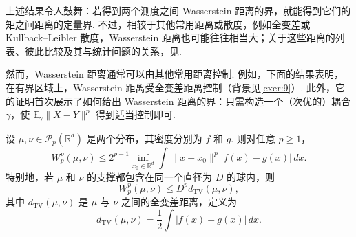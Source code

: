 上述结果令人鼓舞：若得到两个测度之间 Wasserstein 距离的界，就能得到它们的矩之间距离的定量界. 不过，相较于其他常用距离或散度，例如全变差或 Kullback--Leibler 散度，Wasserstein 距离也可能往往相当大；关于这些距离的列表、彼此比较及其与统计问题的关系，见\cite[第 2 章]{ref302}.

然而，Wasserstein 距离通常可以由其他常用距离控制. 例如，下面的结果表明，在有界区域上，Wasserstein 距离受全变差距离控制（背景见\autoref{exer:9}）. 此外，它的证明首次展示了如何给出 Wasserstein 距离的界：只需构造一个（次优的）耦合 $\gamma$，使 $\mathbb E_\gamma\lVert X-Y\rVert^p$ 得到适当控制即可.

\begin{theorem}\label{thm:1.6}
设 $\mu,\nu\in\mathcal P_p(\mathbb R^d)$ 是两个分布，其密度分别为 $f$ 和 $g$. 则对任意 $p\ge1$，
$$
W_p^p(\mu,\nu)\le2^{p-1}\inf_{x_0\in\mathbb R^d}
\int\lVert x-x_0\rVert^p|f(x)-g(x)|\,dx.
$$
特别地，若 $\mu$ 和 $\nu$ 的支撑都包含在同一个直径为 $D$ 的球内，则
$$
W_p^p(\mu,\nu)\le D^p d_{\mathrm{TV}}(\mu,\nu),
$$
其中 $d_{\mathrm{TV}}(\mu,\nu)$ 是 $\mu$ 与 $\nu$ 之间的全变差距离，定义为
$$
d_{\mathrm{TV}}(\mu,\nu)=\frac12\int|f(x)-g(x)|\,dx.
$$
\end{theorem}
